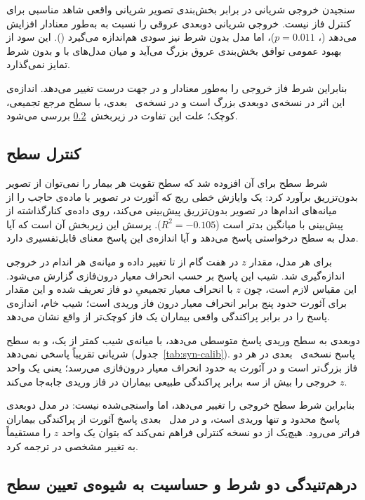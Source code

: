 سنجیدن خروجی شریانی در برابر بخش‌بندی تصویر شریانی واقعی شاهد مناسبی برای کنترل فاز نیست. خروجی شریانی  دوبعدی  عروقی را نسبت به  به‌طور معنادار افزایش می‌دهد (، $p = 0.011$)، اما مدل بدون شرط نیز سودی هم‌اندازه می‌گیرد (). این سود از بهبود عمومی توافق بخش‌بندی عروق بزرگ می‌آید و میان مدل‌های با و بدون شرط تمایز نمی‌گذارد.

بنابراین شرط فاز خروجی را به‌طور معنادار و در جهت درست تغییر می‌دهد. اندازه‌ی این اثر در نسخه‌ی دوبعدی بزرگ است و در نسخه‌ی ~بعدی، با سطح مرجع تجمیعی، کوچک؛ علت این تفاوت در زیربخش~\ref{sec:e-level-policy} بررسی می‌شود.

\subsection{کنترل سطح}

شرط سطح برای آن افزوده شد که سطح تقویت هر بیمار را نمی‌توان از تصویر بدون‌تزریق برآورد کرد: یک وایازش خطی ریج که  آئورت در تصویر با ماده‌ی حاجب را از میانه‌های  اندام‌ها در تصویر بدون‌تزریق پیش‌بینی می‌کند، روی داده‌ی کنارگذاشته از پیش‌بینی با میانگین بدتر است ($R^2 = -0.105$). پرسش این زیربخش آن است که آیا مدل به سطح درخواستی پاسخ می‌دهد و آیا اندازه‌ی این پاسخ معنای قابل‌تفسیری دارد.

برای هر مدل، مقدار $z$ در هفت گام از  تا  تغییر داده و میانه‌ی  هر اندام در خروجی اندازه‌گیری شد. شیب این پاسخ بر حسب انحراف معیار درون‌فازی گزارش می‌شود. این مقیاس لازم است، چون $z$ با انحراف معیار تجمیعیِ دو فاز تعریف شده و این مقدار برای آئورت حدود پنج برابر انحراف معیار درون فاز وریدی است؛ شیب خام، اندازه‌ی پاسخ را در برابر پراکندگی واقعی بیماران یک فاز کوچک‌تر از واقع نشان می‌دهد.

 دوبعدی به سطح وریدی پاسخ متوسطی می‌دهد، با میانه‌ی شیب کمتر از یک، و به سطح شریانی تقریباً پاسخی نمی‌دهد (جدول~\ref{tab:syn-calib}). پاسخ نسخه‌ی ~بعدی در هر دو فاز بزرگ‌تر است و در آئورت به حدود  انحراف معیار درون‌فازی می‌رسد؛ یعنی یک واحد $z$ خروجی را بیش از سه برابر پراکندگی طبیعی بیماران در فاز وریدی جابه‌جا می‌کند.

بنابراین شرط سطح خروجی را تغییر می‌دهد، اما واسنجی‌شده نیست: در مدل دوبعدی پاسخ محدود و تنها وریدی است، و در مدل ~بعدی پاسخ آئورت از پراکندگی بیماران فراتر می‌رود. هیچ‌یک از دو نسخه کنترلی فراهم نمی‌کند که بتوان یک واحد $z$ را مستقیماً به تغییر مشخصی در  ترجمه کرد.

\subsection{درهم‌تنیدگی دو شرط و حساسیت به شیوه‌ی تعیین سطح}
\label{sec:e-level-policy}

